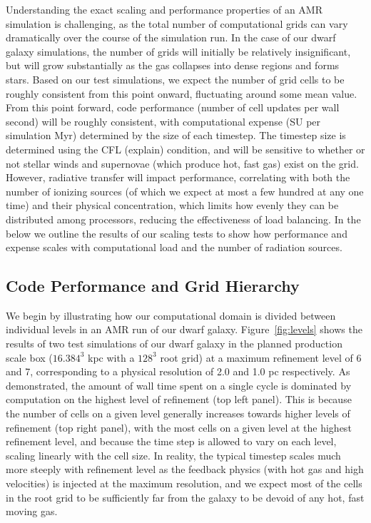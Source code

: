 \documentclass[11pt]{article}
\begin{document}
Understanding the exact scaling and performance properties of an AMR simulation is challenging, as the total number of computational grids can vary dramatically over the course of the simulation run. In the case of our dwarf galaxy simulations, the number of grids will initially be relatively insignificant, but will grow substantially as the gas collapses into dense regions and forms stars. Based on our test simulations, we expect the number of grid cells to be roughly consistent from this point onward, fluctuating around some mean value. From this point forward, code performance (number of cell updates per wall second) will be roughly consistent, with computational expense (SU per simulation Myr) determined by the size of each timestep. The timestep size is determined using the CFL (explain) condition, and will be sensitive to whether or not stellar winds and supernovae (which produce hot, fast gas) exist on the grid. However, radiative transfer will impact performance, correlating with both the number of ionizing sources (of which we expect at most a few hundred at any one time) and their physical concentration, which limits how evenly they can be distributed among processors, reducing the effectiveness of load balancing. In the below we outline the results of our scaling tests to show how performance and expense scales with computational load and the number of radiation sources. 

\subsection{Code Performance and Grid Hierarchy}

We begin by illustrating how our computational domain is divided between individual levels in an AMR run of our dwarf galaxy. Figure~\ref{fig:levels} shows the results of two test simulations of our dwarf galaxy in the planned production scale box ($16.384^3$ kpc with a $128^3$ root grid) at a maximum refinement level of 6 and 7, corresponding to a physical resolution of 2.0 and 1.0 pc respectively. As demonstrated, the amount of wall time spent on a single cycle is dominated by computation on the highest level of refinement (top left panel). This is because the number of cells on a given level generally increases towards higher levels of refinement (top right panel), with the most cells on a given level at the highest refinement level, and because the time step is allowed to vary on each level, scaling linearly with the cell size. In reality, the typical timestep scales much more steeply with refinement level as the feedback physics (with hot gas and high velocities) is injected at the maximum resolution, and we expect most of the cells in the root grid to be sufficiently far from the galaxy to be devoid of any hot, fast moving gas. 
\end{document}
